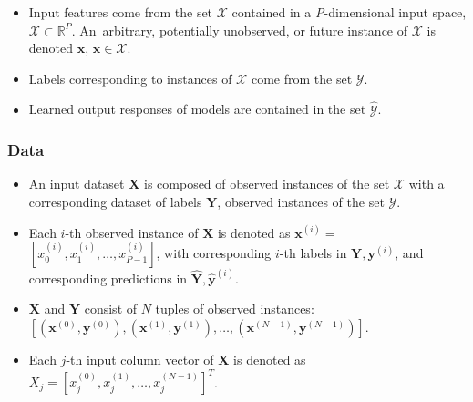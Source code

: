 \documentclass[information,article,accept,moreauthors,pdftex]{Definitions/mdpi}
\begin{document}
{\begin{itemize}[leftmargin=*,labelsep=5.8mm]
	\item Input features come from the set $\mathcal{X}$ contained in a \textit{P}-dimensional input space, $\mathcal{X} \subset \mathbb{R}^P$.  An~arbitrary, potentially unobserved, or future instance of $\mathcal{X}$ is denoted $\mathbf{x}$, $\mathbf{x} \in \mathcal{X}$.
	\item Labels corresponding to instances of $\mathcal{X}$ come from the set $\mathcal{Y}$.
	\item Learned output responses of models are contained in the set $\mathcal{\hat{Y}}$. %
\end{itemize}	

\subsubsection{Data} 

\begin{itemize}[leftmargin=*,labelsep=5.8mm]
	\item An input dataset $\mathbf{X}$ is composed of observed instances of the set $\mathcal{X}$ with a corresponding dataset of labels $\mathbf{Y}$, observed instances of the set $\mathcal{Y}$. 
	\item Each $i$-th observed instance of $\mathbf{X}$ is denoted as $\mathbf{x}^{(i)} = $  
	$[x_0^{(i)}, x_1^{(i)}, \dots, x_{\textit{P}-1}^{(i)}]$, with corresponding $i$-th labels in $\mathbf{Y}, \mathbf{y}^{(i)}$, and corresponding predictions in $\mathbf{\hat{Y}}, \mathbf{\hat{y}}^{(i)}$. %
	\item $\mathbf{X}$ and $\mathbf{Y}$ consist of $N$ tuples of observed instances: $[(\mathbf{x}^{(0)},\mathbf{y}^{(0)}), (\mathbf{x}^{(1)},\mathbf{y}^{(1)}), \dots,(\mathbf{x}^{(N-1)},\mathbf{y}^{(N-1)})]$. %
	\item Each $j$-th input column vector of $\mathbf{X}$ is denoted as $X_j = [x_{j}^{(0)}, x_{j}^{(1)}, \dots, x_{j}^{(N-1)}]^T$.
\end{itemize}	 

}
\end{document}
